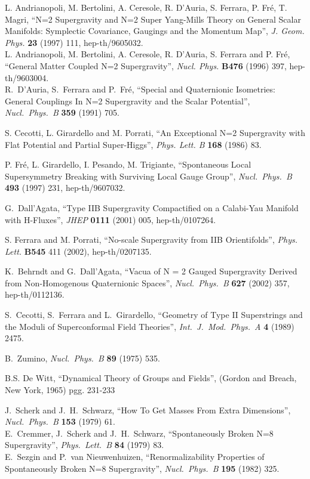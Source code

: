 \documentclass[a4paper,12pt]{article}
\begin{document}
\begin{thebibliography}{99}
L. Andrianopoli, M. Bertolini, A. Ceresole, R. D'Auria, S. Ferrara, P. Fr\'e, T. Magri,
``N=2 Supergravity and N=2 Super Yang-Mills Theory on General Scalar Manifolds: Symplectic Covariance, Gaugings and the Momentum Map'',
{\it  J. Geom. Phys.} {\bf 23} (1997) 111, hep-th/9605032.\\
L. Andrianopoli, M. Bertolini, A. Ceresole, R. D'Auria, S. Ferrara and P. Fr\'e, ``General Matter Coupled N=2 Supergravity'', {\it Nucl. Phys.}
{\bf  B476} (1996) 397, hep-th/9603004.\\
R.~D'Auria, S.~Ferrara and P.~Fr\'e,
``Special and Quaternionic Isometries: General Couplings In N=2 Supergravity and the Scalar Potential'',
{\it Nucl.\ Phys.\ B} {\bf 359} (1991) 705.




S. Cecotti, L. Girardello and M. Porrati, ``An Exceptional N=2
Supergravity with Flat Potential and Partial Super-Higgs'', {\it
Phys. Lett. B} {\bf 168} (1986) 83.


P. Fr\'e, L. Girardello, I. Pesando, M. Trigiante, 
``Spontaneous \coordHE{} Local Supersymmetry Breaking with Surviving Local Gauge Group'',
{\it Nucl.\ Phys.\ B} {\bf 493} (1997) 231, hep-th/9607032.



 G.~Dall'Agata, ``Type IIB Supergravity Compactified on a Calabi-Yau Manifold with H-Fluxes'',
{\it JHEP} {\bf 0111} (2001) 005, hep-th/0107264.


 S. Ferrara and M. Porrati, ``No-scale Supergravity from IIB Orientifolds'',  {\it
Phys. Lett.} {\bf B545} 411 (2002), hep-th/0207135.




K.~Behrndt and G.~Dall'Agata,
``Vacua of N = 2 Gauged Supergravity Derived from Non-Homogenous  Quaternionic Spaces'',
{\it Nucl.\ Phys.\ B} {\bf 627} (2002) 357, hep-th/0112136.




S.~Cecotti, S.~Ferrara and L.~Girardello,
``Geometry of Type II Superstrings and the Moduli of Superconformal Field Theories'',
{\it Int.\ J.\ Mod.\ Phys.\ A} {\bf 4} (1989) 2475.


B.~Zumino,
{\it Nucl.\ Phys.\ B} {\bf 89} (1975) 535.

B.S. De Witt, ``Dynamical Theory of Groups and Fields'', (Gordon and Breach, New York, 1965) pgg. 231-233

 J.~Scherk and J.~H.~Schwarz,
``How To Get Masses From Extra Dimensions'', {\it Nucl.\ Phys.\ B} {\bf 153} (1979) 61.\\
  E.~Cremmer, J.~Scherk and J.~H.~Schwarz, 
``Spontaneously Broken N=8 Supergravity'', {\it Phys.\ Lett.\ B} {\bf 84} (1979) 83.\\
 E.~Sezgin and P.~van Nieuwenhuizen,
``Renormalizability Properties of Spontaneously Broken N=8 Supergravity'', {\it Nucl.\ Phys.\ B} {\bf 195} (1982) 325. 




\end{thebibliography}
\end{document}
